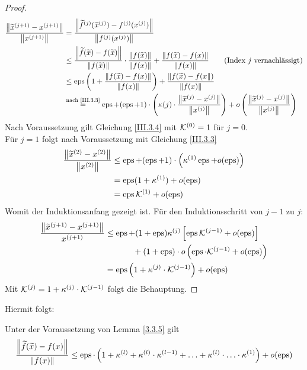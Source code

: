 \begin{proof}
  \begin{align*}
    \frac{\left\| \widetilde{x}^{(j+1)}-x^{(j+1)} \right\|}{\left\| x^{(j+1)} \right\|}
    &= \frac{\left\| \widetilde{f}^{(j)}(\widetilde{x}^{(j)})-f^{(j)}(x^{(j)}) \right\|}
      {\left\| f^{(j)}(x^{(j)}) \right\|} \\
    &\leq \frac{\left\| \widetilde{f}(\widetilde{x})-f(\widetilde{x}) \right\|}{\left\| f(\widetilde{x}) \right\|}
      \cdot \frac{\left\| f(\widetilde{x}) \right\|}{\left\| f(x) \right\|}
      + \frac{\left\| f(\widetilde{x})-f({x}) \right\|}{\left\| f(x) \right\|} 
      \quad\quad \text{(Index $j$ vernachlässigt)}\\
    &\leq \operatorname{eps} \left( 1+ \frac{\left\| f(\widetilde{x})-f({x}) \right\|}{\left\| f(x) \right\|}\right)
      + \frac{\left\| f(\widetilde{x})-f({x} \right\|)}{\left\| f(x) \right\|}\\
    &\overset{\text{nach \ref{III.3.3}}}{=} \operatorname{eps} + (\operatorname{eps}+1) \cdot 						\left(\kappa{(j)}\cdot \frac{\left\| \widetilde{x}^{(j)}-x^{(j)} \right\|}{\left\| x^{(j)} \right\|}\right)
      + o\left( \frac{\left\| \widetilde{x}^{(j)}-x^{(j)} \right\|}{\left\| x^{(j)} \right\|}\right)
  \end{align*}
  Nach Voraussetzung gilt Gleichung \eqref{III.3.4}  mit $\mathcal{K}^{(0)}=1$ für $j=0$. \\
  Für $j=1$ folgt nach Voraussetzung mit Gleichung \eqref{III.3.3}
  \begin{align*}
    \frac{\left\| \widetilde{x}^{(2)}-x^{(2)} \right\|}{\left\| x^{(2)} \right\|}
    & \leq \operatorname{eps} +(\operatorname{eps}+1) \cdot \left( \kappa^{(1)}\operatorname{eps}+ o(\operatorname{eps})\right) \\
    &= \operatorname{eps}(1+\kappa^{(1)}) + o(\operatorname{eps}) \\
    &= \operatorname{eps}\mathcal{K}^{(1)} + o(\operatorname{eps})
  \end{align*}
  Womit der Induktionsanfang gezeigt ist.
  Für den Induktionsschritt von $j-1$ zu $j$:
  \begin{align*}
    \frac{\nn{\widetilde{x}^{(j+1)}-x^{(j+1)}}}{x^{(j+1)}}
    & \leq \Eps + (1+\Eps)\kappa^{(j)} \left[ \Eps \K^{(j-1)}+ o(\Eps) \right] \\
    &\phantom{\leq \Eps+} + (1+\Eps) \cdot o\left( \Eps\cdot \K^{(j-1)} +o(\Eps)\right) \\
    &= \Eps\left(1+\kappa^{(j)}\cdot \K^{(j-1)}\right)+ o(\Eps)
  \end{align*}
  Mit $\mathcal{K}^{(j)} = 1+ \kappa^{(j)}\cdot \mathcal{K}^{(j-1)}$ folgt die Behauptung.
\end{proof}

Hiermit folgt:

\begin{Kore}
  \label{3.3.6}
  Unter der Voraussetzung von Lemma \ref{3.3.5} gilt
  \begin{gather}
    \frac{\left\| \widetilde{f}(\widetilde{x})-f(x) \right\|}{\left\| f(x) \right\|} \leq 
    \operatorname{eps}\cdot \left( 1+\kappa^{(l)}+ \kappa^{(l)}\cdot \kappa^{(l-1)}+ \dotsc
      + \kappa^{(l)}\cdot \dotsc \cdot \kappa^{(1)}\right) + o(\operatorname{eps}) 
    \label{III.3.5}
  \end{gather}~
\end{Kore}

